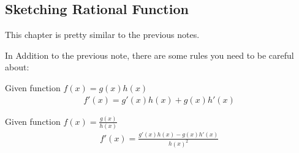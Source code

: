 \subsection{Sketching Rational Function}
This chapter is pretty similar to the previous notes. 

In Addition to the previous note, there are some rules you need to be careful about:

\begin{definition}
    Given function $f(x) = g(x)h(x)$
    \begin{align*}
        f'(x) = g'(x)h(x) + g(x)h'(x)
    \end{align*}
\end{definition}

\begin{definition}
    Given function $f(x) = \frac{g(x)}{h(x)}$
    \begin{align*}
        f'(x) = \frac{
            g'(x)h(x) - g(x)h'(x)
        }{
            h(x)^2
        }
    \end{align*}
\end{definition}